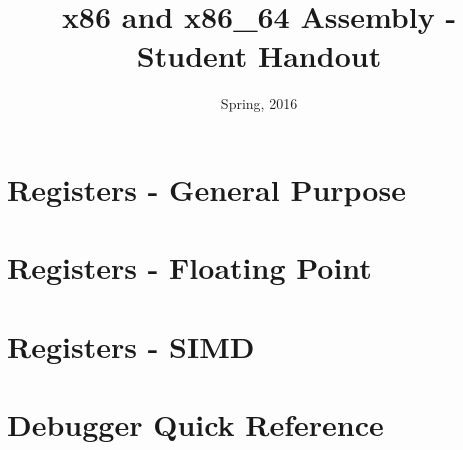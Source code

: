 \documentclass{article}
\begin{document}
\title{x86 and x86\_64 Assembly - Student Handout}
\date{Spring, 2016}
\maketitle

\section{Registers - General Purpose}

\section{Registers - Floating Point}

\section{Registers - SIMD}

\section{Debugger Quick Reference}
\end{document}
